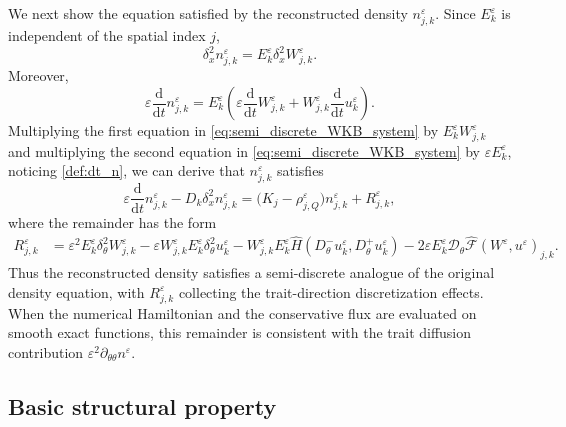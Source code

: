 \documentclass[11pt]{article}
\begin{document}
We next show the equation satisfied by the reconstructed density
\(n_{j,k}^\varepsilon\). Since \(E_k^\varepsilon\) is independent of the
spatial index \(j\),
\[
\delta_x^2 n_{j,k}^\varepsilon
=
E_k^\varepsilon\delta_x^2W_{j,k}^\varepsilon .
\]
Moreover,
\begin{equation}\label{def:dt_n}
\varepsilon\frac{\mathrm d}{\mathrm dt}n_{j,k}^\varepsilon
=
E_k^\varepsilon
\left(
\varepsilon\frac{\mathrm d}{\mathrm dt}W_{j,k}^\varepsilon
+
W_{j,k}^\varepsilon
\frac{\mathrm d}{\mathrm dt}u_k^\varepsilon
\right).
\end{equation}
Multiplying the first equation in \eqref{eq:semi_discrete_WKB_system} by $E_k^\varepsilon W_{j,k}^\varepsilon$ and multiplying the second equation in  \eqref{eq:semi_discrete_WKB_system} by $\varepsilon E_k^\varepsilon$, 
noticing \eqref{def:dt_n},
we can derive that \(n_{j,k}^\varepsilon\) satisfies
\begin{equation}\label{eq:semi_discrete_n}
\varepsilon\frac{\mathrm d}{\mathrm dt} n_{j,k}^\varepsilon
-
D_k\delta_x^2 n_{j,k}^\varepsilon
=
\bigl(K_j-\rho_{j,Q}^\varepsilon\bigr)n_{j,k}^\varepsilon
+
R_{j,k}^\varepsilon ,
\end{equation}
where the remainder has the form 
\begin{align}
R_{j,k}^\varepsilon
&=
\varepsilon^2
E_k^\varepsilon
\delta_\theta^2 W_{j,k}^\varepsilon
-
\varepsilon
W_{j,k}^\varepsilon
E_k^\varepsilon
\delta_\theta^2 u_k^\varepsilon
-
W_{j,k}^\varepsilon
E_k^\varepsilon
\widehat H
\left(
D_\theta^-u_k^\varepsilon,
D_\theta^+u_k^\varepsilon
\right)
-
2\varepsilon
E_k^\varepsilon
\mathcal D_\theta
\widehat{\mathcal F}(W^\varepsilon,u^\varepsilon)_{j,k}.
\label{eq:R_exact}
\end{align}
Thus the reconstructed density satisfies a semi-discrete analogue of the
original density equation, with \(R_{j,k}^\varepsilon\) collecting the
trait-direction discretization effects. When the numerical Hamiltonian and
the conservative flux are evaluated on smooth exact functions, this remainder
is consistent with the trait diffusion contribution
\(\varepsilon^2\partial_{\theta\theta}n^\varepsilon\).






\subsection{Basic structural property}
\end{document}
